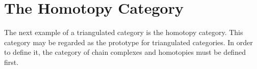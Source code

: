 




\section{The Homotopy Category}
    
    The next example of a triangulated category is the homotopy category. This category may be regarded as the prototype for triangulated categories. In order to define it, the category of chain complexes and homotopies must be defined first.

